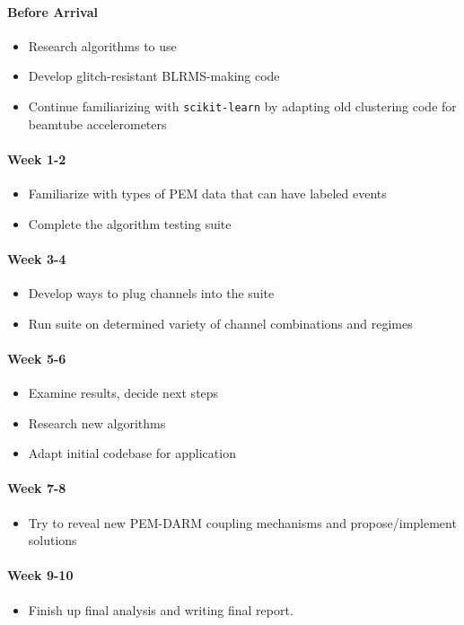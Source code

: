 \documentclass[colorlinks=true,pdfstartview=FitV,linkcolor=blue,
            citecolor=red,urlcolor=magenta]{ligodoc}
\begin{document}
\paragraph{Before Arrival}
\begin{itemize}
\item Research algorithms to use
\item Develop glitch-resistant BLRMS-making code
\item Continue familiarizing with \texttt{scikit-learn} by adapting old clustering code for beamtube accelerometers
\end{itemize}
\paragraph{Week 1-2}
\begin{itemize}
\item Familiarize with types of PEM data that can have labeled events
\item Complete the algorithm testing suite
\end{itemize}
\paragraph{Week 3-4}
\begin{itemize}
\item Develop ways to plug channels into the suite
\item Run suite on determined variety of channel combinations and regimes
\end{itemize}
\paragraph{Week 5-6}
\begin{itemize}
\item Examine results, decide next steps
\item Research new algorithms
\item Adapt initial codebase for application
\end{itemize}
\paragraph{Week 7-8}
\begin{itemize}
\item Try to reveal new PEM-DARM coupling mechanisms and propose/implement solutions
\end{itemize}
\paragraph{Week 9-10}
\begin{itemize}
\item Finish up final analysis and writing final report.
\end{itemize}
\end{document}
